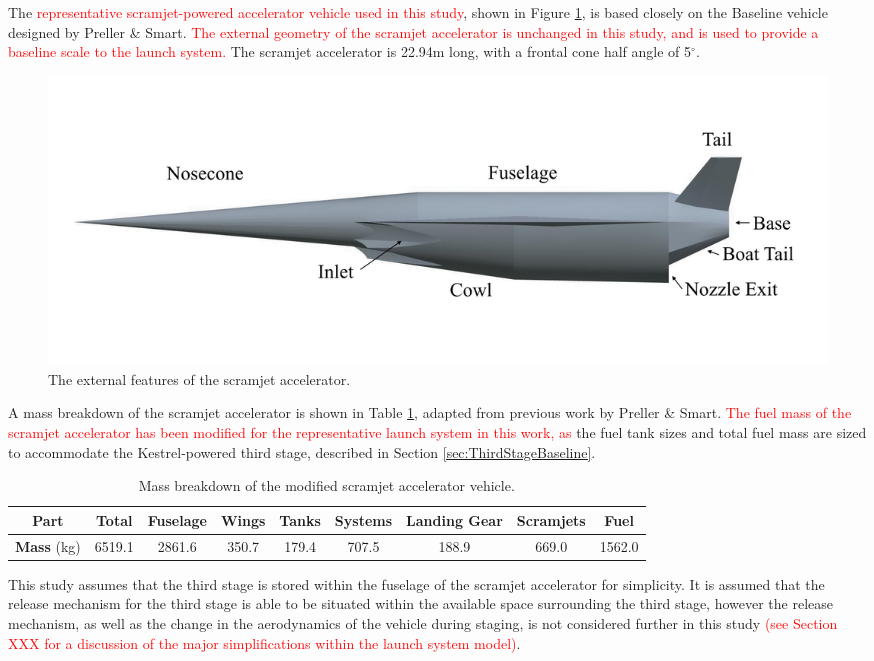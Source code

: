 		The \textcolor{red}{representative scramjet-powered accelerator vehicle used in this study}, shown in Figure \ref{fig:SPARTANlabelled}, is based closely on the Baseline vehicle designed by Preller \& Smart\cite{Preller2017b}. \textcolor{red}{The external geometry of the scramjet accelerator is unchanged in this study, and is used to provide a baseline scale to the launch system.} The scramjet accelerator is 22.94m long, with a frontal cone half angle of 5$^\circ$\cite{Preller2017b}. 
		\begin{figure}[ht]
			\centering
			\includegraphics[width=0.7\linewidth]{figures/3_vehicle_design/SPARTANlabelled}
			\caption{The external features of the scramjet accelerator.}
			\label{fig:SPARTANlabelled}
		\end{figure}
		A mass breakdown of the scramjet accelerator is shown in Table \ref{tab:MassBreakdown}, adapted from previous work by Preller \& Smart\cite{Preller2017b}. \textcolor{red}{The fuel mass of the scramjet accelerator has been modified for the representative launch system in this work, as} the fuel tank sizes and total fuel mass are sized to accommodate the Kestrel-powered third stage, described in Section \ref{sec:ThirdStageBaseline}.
		\begin{table}[h]
		\begin{tabular}{|c|c|c|c|c|c|c|c|c|}
			\hline  \textbf{Part} & Total & Fuselage & Wings & Tanks & Systems & Landing Gear & Scramjets & Fuel \\ 
			\hline \textbf{Mass} (kg) & 6519.1 & 2861.6 & 350.7 & 179.4 & 707.5 & 188.9 & 669.0 & 1562.0 \\ 
			\hline 
		\end{tabular} 
		\caption{Mass breakdown of the modified scramjet accelerator vehicle.}
		\label{tab:MassBreakdown}
		\end{table}
This study assumes that the third stage is stored within the fuselage of the scramjet accelerator for simplicity. It is assumed that the release mechanism for the third stage is able to be situated within the available space surrounding the third stage, however the release mechanism, as well as the change in the aerodynamics of the vehicle during staging,  is not considered further in this study \textcolor{red}{(see Section XXX for a discussion of the major simplifications within the launch system model)}. %
		
